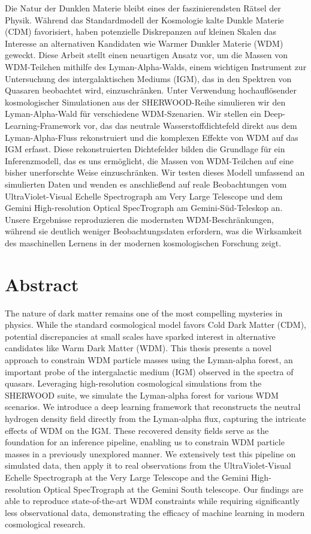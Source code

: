 \documentclass[
     12pt,                    %
     a4paper,             %
     BCOR=10mm,     %
     DIV=14,                 %
     listof=totoc,                    %
     bibliography=totoc,       %
     index=totoc,              %
     twoside,
     headsepline
     ]{scrreprt}
\begin{document}
Die Natur der Dunklen Materie bleibt eines der faszinierendsten Rätsel der Physik. Während das Standardmodell der Kosmologie kalte Dunkle Materie (CDM) favorisiert, haben potenzielle Diskrepanzen auf kleinen Skalen das Interesse an alternativen Kandidaten wie Warmer Dunkler Materie (WDM) geweckt. Diese Arbeit stellt einen neuartigen Ansatz vor, um die Massen von WDM-Teilchen mithilfe des Lyman-Alpha-Walds, einem wichtigen Instrument zur Untersuchung des intergalaktischen Mediums (IGM), das in den Spektren von Quasaren beobachtet wird, einzuschränken. Unter Verwendung hochauflösender kosmologischer Simulationen aus der SHERWOOD-Reihe simulieren wir den Lyman-Alpha-Wald für verschiedene WDM-Szenarien. Wir stellen ein Deep-Learning-Framework vor, das das neutrale Wasserstoffdichtefeld direkt aus dem Lyman-Alpha-Fluss rekonstruiert und die komplexen Effekte von WDM auf das IGM erfasst. Diese rekonstruierten Dichtefelder bilden die Grundlage für ein Inferenzmodell, das es uns ermöglicht, die Massen von WDM-Teilchen auf eine bisher unerforschte Weise einzuschränken. Wir testen dieses Modell umfassend an simulierten Daten und wenden es anschließend auf reale Beobachtungen vom UltraViolet-Visual Echelle Spectrograph am Very Large Telescope und dem Gemini High-resolution Optical SpecTrograph am Gemini-Süd-Teleskop an. Unsere Ergebnisse reproduzieren die modernsten WDM-Beschränkungen, während sie deutlich weniger Beobachtungsdaten erfordern, was die Wirksamkeit des maschinellen Lernens in der modernen kosmologischen Forschung zeigt.
\section*{Abstract}

The nature of dark matter remains one of the most compelling mysteries in physics. While the standard cosmological model favors Cold Dark Matter (CDM), potential discrepancies at small scales have sparked interest in alternative candidates like Warm Dark Matter (WDM). This thesis presents a novel approach to constrain WDM particle masses using the Lyman-alpha forest, an important probe of the intergalactic medium (IGM) observed in the spectra of quasars. Leveraging high-resolution cosmological simulations from the SHERWOOD suite, we simulate the Lyman-alpha forest for various WDM scenarios. We introduce a deep learning framework that reconstructs the neutral hydrogen density field directly from the Lyman-alpha flux, capturing the intricate effects of WDM on the IGM. These recovered density fields serve as the foundation for an inference pipeline, enabling us to constrain WDM particle masses in a previously unexplored manner. We extensively test this pipeline on simulated data, then apply it to real observations from the UltraViolet-Visual Echelle Spectrograph at the Very Large Telescope and the Gemini High-resolution Optical SpecTrograph at the Gemini South telescope. Our findings are able to reproduce state-of-the-art WDM constraints while requiring significantly less observational data, demonstrating the efficacy of machine learning in modern cosmological research.
\cleardoublepage
\end{document}
